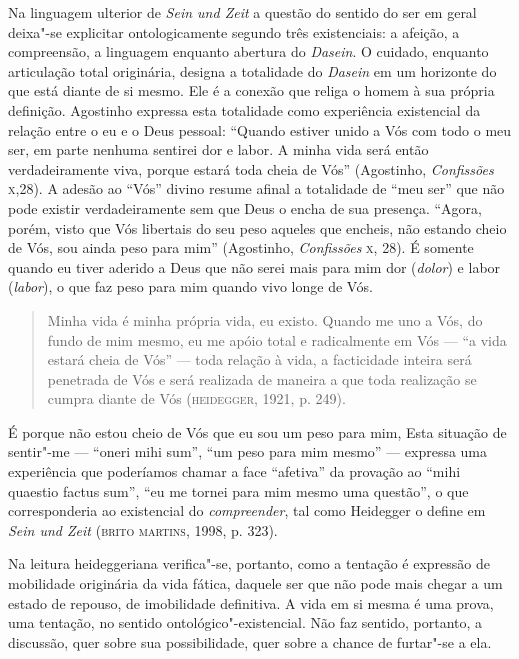 Na linguagem ulterior de \emph{Sein und Zeit} a questão do
sentido do ser em geral deixa"-se explicitar ontologicamente
segundo três existenciais: a afeição, a compreensão, a linguagem
enquanto abertura do \emph{Dasein}. O cuidado, enquanto
articulação total originária, designa a totalidade do
\emph{Dasein} em um horizonte do que está diante de si mesmo.
Ele é a conexão que religa o homem à sua própria definição.
Agostinho expressa esta totalidade como experiência existencial
da relação entre o eu e o Deus pessoal: “Quando estiver unido a
Vós com todo o meu ser, em parte nenhuma sentirei dor e labor. A
minha vida será então verdadeiramente viva, porque estará toda
cheia de Vós” (Agostinho, \emph{Confissões} \textsc{x},28). A adesão ao
``Vós” divino resume afinal a totalidade de “meu ser” que não
pode existir verdadeiramente sem que Deus o encha de sua
presença. “Agora, porém, visto que Vós libertais do seu peso
aqueles que encheis, não estando cheio de Vós, sou ainda peso
para mim” (Agostinho, \emph{Confissões} \textsc{x}, 28). É somente
quando eu tiver aderido a Deus que não serei mais para mim dor
(\emph{dolor}) e labor (\emph{labor}), o que faz peso para
mim quando vivo longe de Vós.

\begin{quote}
Minha vida é minha própria vida, eu existo. Quando me uno a Vós,
do fundo de mim mesmo, eu me apóio total e radicalmente em Vós ---
“a vida estará cheia de Vós” --- toda relação à vida, a
facticidade inteira será penetrada de Vós e será realizada de
maneira a que toda realização se cumpra diante de Vós
(\textsc{heidegger}, 1921, p. 249). 
\end{quote}

É porque não estou cheio de Vós que eu sou um peso para mim, Esta
situação de sentir"-me --- “oneri mihi sum”, “um peso para mim
mesmo” --- expressa uma experiência que poderíamos chamar a face
“afetiva” da provação ao “mihi quaestio factus sum”, “eu me
tornei para mim mesmo uma questão”, o que corresponderia ao
existencial do \emph{compreender}, tal como Heidegger o define
em \emph{Sein und Zeit} (\textsc{brito martins}, 1998, p. 323).  

Na leitura heideggeriana verifica"-se, portanto, como a tentação é
expressão de mobilidade originária da vida fática, daquele ser
que não pode mais chegar a um estado de repouso, de imobilidade
definitiva. A vida em si mesma é uma prova, uma tentação, no
sentido ontológico"-existencial. Não faz sentido, portanto, a
discussão, quer sobre sua possibilidade, quer sobre a chance de
furtar"-se a ela.  

